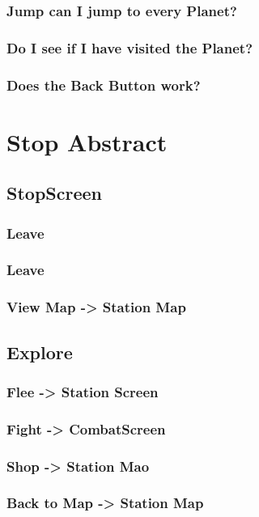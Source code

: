\documentclass[11pt]{article}
\begin{document}
\subsubsection{Jump can I jump to every Planet?}
\subsubsection{Do I see if I have visited the Planet?}
\subsubsection{ Does the Back Button work?}


\section{Stop Abstract}
\label{sec:org3bde3ec}

\subsection{StopScreen}

\subsubsection{Leave}

\subsubsection{Leave}
\subsubsection{View Map -> Station Map}

\subsection{Explore}
\subsubsection{Flee -> Station Screen}
\subsubsection{Fight -> CombatScreen}
\subsubsection{Shop -> Station Mao}
\subsubsection{Back to Map -> Station Map}
\end{document}

